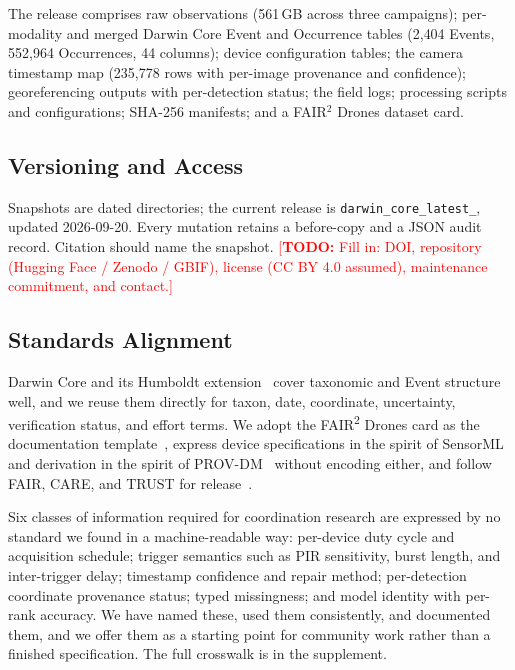 \documentclass[sigconf]{acmart}
\newcommand{\TODO}[1]{\textcolor{red}{\footnotesize[\textbf{TODO:} #1]}}
\newcommand{\TODO}[1]{}
\begin{document}
The release comprises raw observations (561\,GB across three
campaigns); per-modality and merged Darwin Core Event and Occurrence
tables (2{,}404 Events, 552{,}964 Occurrences, 44 columns); device
configuration tables; the camera timestamp map (235{,}778 rows with
per-image provenance and confidence); georeferencing outputs with
per-detection status; the field logs; processing scripts and
configurations; SHA-256 manifests; and a FAIR$^2$ Drones dataset card.

\subsection{Versioning and Access}

Snapshots are dated directories; the current release is
\texttt{darwin\_core\_\allowbreak latest\_}, updated 2026-09-20. Every
mutation retains a before-copy and a JSON audit record. Citation should
name the snapshot.
\TODO{Fill in: DOI, repository (Hugging Face / Zenodo / GBIF),
license (CC BY 4.0 assumed), maintenance commitment, and contact.}

\subsection{Standards Alignment}
\label{sec:crosswalk}

Darwin Core and its Humboldt extension~\cite{tdwgHumboldt} cover
taxonomic and Event structure well, and we reuse them directly for
taxon, date, coordinate, uncertainty, verification status, and effort
terms. We adopt the FAIR\textsuperscript{2} Drones card as the
documentation template~\cite{pierrat2025proximal}, express device
specifications in the spirit of SensorML~\cite{ogcSensorML} and
derivation in the spirit of PROV-DM~\cite{w3cProvDM} without encoding
either, and follow FAIR, CARE, and TRUST for
release~\cite{wilkinson2016fair,carroll2020care,lin2020trust}.

Six classes of information required for coordination research are
expressed by no standard we found in a machine-readable way: per-device
duty cycle and acquisition schedule; trigger semantics such as PIR
sensitivity, burst length, and inter-trigger delay; timestamp confidence
and repair method; per-detection coordinate provenance status; typed
missingness; and model identity with per-rank accuracy. We have named
these, used them consistently, and documented them, and we offer them as
a starting point for community work rather than a finished
specification. The full crosswalk is in the supplement.
\end{document}
